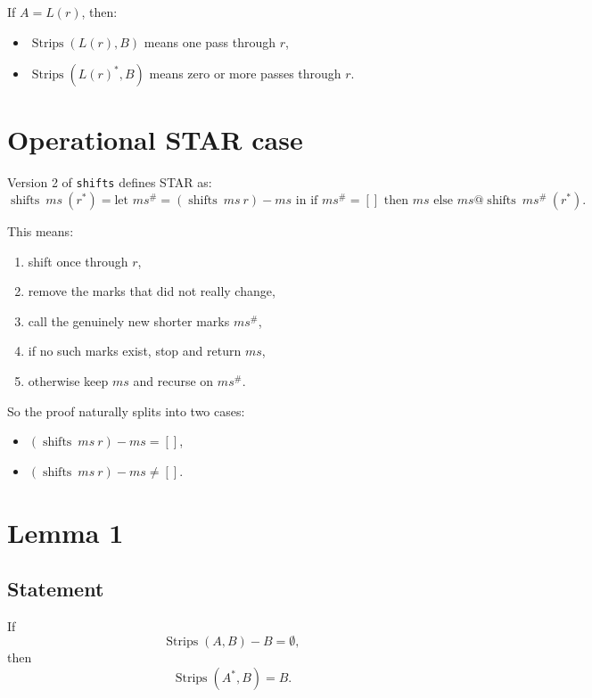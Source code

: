 \documentclass[11pt]{article}
\begin{document}
If \(A=L(r)\), then:

\begin{itemize}
\item \(\operatorname{Strips}(L(r),B)\) means one pass through \(r\),
\item \(\operatorname{Strips}(L(r)^*,B)\) means zero or more passes through \(r\).
\end{itemize}

\section*{Operational STAR case}

Version 2 of \texttt{shifts} defines STAR as:
\[
\operatorname{shifts}\ ms\ (r^*)
=
\text{let } ms^\# = (\operatorname{shifts}\ ms\ r)-ms
\text{ in if } ms^\# = [] \text{ then } ms \text{ else } ms @ \operatorname{shifts}\ ms^\#\ (r^*).
\]

This means:

\begin{enumerate}
\item shift once through \(r\),
\item remove the marks that did not really change,
\item call the genuinely new shorter marks \(ms^\#\),
\item if no such marks exist, stop and return \(ms\),
\item otherwise keep \(ms\) and recurse on \(ms^\#\).
\end{enumerate}

So the proof naturally splits into two cases:

\begin{itemize}
\item \( (\operatorname{shifts}\ ms\ r)-ms = [] \),
\item \( (\operatorname{shifts}\ ms\ r)-ms \neq [] \).
\end{itemize}

\section*{Lemma 1}

\subsection*{Statement}

If
\[
\operatorname{Strips}(A,B)-B=\emptyset,
\]
then
\[
\operatorname{Strips}(A^*,B)=B.
\]
\end{document}
